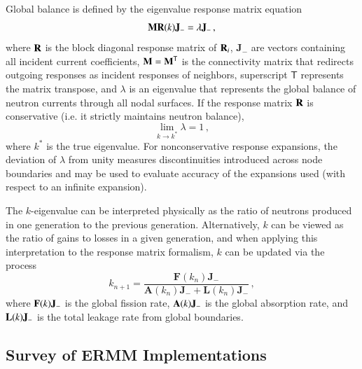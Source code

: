 Global balance is defined by the eigenvalue response matrix
equation
\begin{equation}
  \mathbf{M}\mathbf{R}(k)\mathbf{J_-}  = \lambda \mathbf{J_-} \, ,
  \label{eq:erme}
\end{equation}
where 
$\mathbf{R}$ is the block diagonal response matrix of $\mathbf{R}_i$,  
$\mathbf{J}_{-}$ are vectors containing all incident current coefficients, 
$\mathbf{M}=\mathbf{M}^\mathsf{T}$ is 
the connectivity matrix that redirects outgoing responses as incident
responses of neighbors, superscript $\mathsf{T}$ represents the matrix 
transpose, and $\lambda$ is an eigenvalue that
represents the global balance of neutron currents through all 
nodal surfaces.
If the response matrix $\mathbf{R}$ is conservative (i.e. it
strictly maintains neutron balance),
\begin{equation}
 \lim_{k\to k^*} \lambda = 1 \, ,
\end{equation}
where $k^*$ is the true eigenvalue.
For nonconservative response expansions, the deviation of $\lambda$ from
unity measures discontinuities introduced across node boundaries and 
may be used to evaluate accuracy of the expansions used (with 
respect to an infinite expansion).


The $k$-eigenvalue can be interpreted physically as the ratio of neutrons
produced in one generation to the previous generation. 
Alternatively, $k$ can be viewed as the ratio of gains to losses in a given 
generation, and when applying this interpretation to the response matrix 
formalism, $k$ can be updated via the process
\begin{equation}
  k_{n+1} = \frac{\mathbf{F}(k_{n})\mathbf{J}_{-}} 
  { \mathbf{A}(k_{n}) \mathbf{J}_{-} + \mathbf{L}(k_{n}) \mathbf{J}_{-} }\, ,
\label{eq:picard}
\end{equation}
where $\mathbf{F}(k)\mathbf{J}_{-}$ is the global fission rate, 
$\mathbf{A}(k) \mathbf{J}_{-}$ is the global absorption rate,
and $\mathbf{L}(k) \mathbf{J}_{-}$ is the total leakage rate
from global boundaries.

\subsection{Survey of ERMM Implementations}

